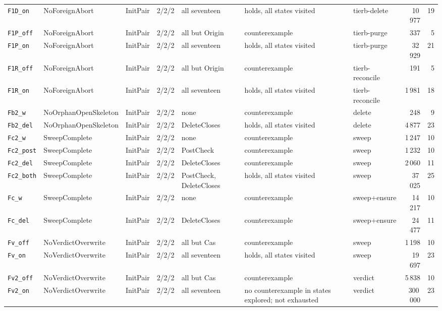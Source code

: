 \documentclass[a4paper,10pt,fleqn]{article}
\begin{document}
{\begin{center}
\begin{tabularx}{\textwidth}{@{}l l l l X X l r r@{}}
\texttt{F1D\_on} & NoForeignAbort & InitPair & 2/2/2 & all seventeen & holds, all states visited & tierb-delete & 10\,977 & 19 \\
\texttt{F1P\_off} & NoForeignAbort & InitPair & 2/2/2 & all but Origin & counterexample & tierb-purge & 337 & 5 \\
\texttt{F1P\_on} & NoForeignAbort & InitPair & 2/2/2 & all seventeen & holds, all states visited & tierb-purge & 32\,929 & 21 \\
\texttt{F1R\_off} & NoForeignAbort & InitPair & 2/2/2 & all but Origin & counterexample & tierb-reconcile & 191 & 5 \\
\texttt{F1R\_on} & NoForeignAbort & InitPair & 2/2/2 & all seventeen & holds, all states visited & tierb-reconcile & 1\,981 & 18 \\
\texttt{Fb2\_w} & NoOrphanOpenSkeleton & InitPair & 2/2/2 & none & counterexample & delete & 248 & 9 \\
\texttt{Fb2\_del} & NoOrphanOpenSkeleton & InitPair & 2/2/2 & DeleteCloses & holds, all states visited & delete & 4\,877 & 23 \\
\texttt{Fc2\_w} & SweepComplete & InitPair & 2/2/2 & none & counterexample & sweep & 1\,247 & 10 \\
\texttt{Fc2\_post} & SweepComplete & InitPair & 2/2/2 & PostCheck & counterexample & sweep & 1\,232 & 10 \\
\texttt{Fc2\_del} & SweepComplete & InitPair & 2/2/2 & DeleteCloses & counterexample & sweep & 2\,060 & 11 \\
\texttt{Fc2\_both} & SweepComplete & InitPair & 2/2/2 & PostCheck, DeleteCloses & holds, all states visited & sweep & 37\,025 & 25 \\
\texttt{Fc\_w} & SweepComplete & InitPair & 2/2/2 & none & counterexample & sweep+ensure & 14\,217 & 10 \\
\texttt{Fc\_del} & SweepComplete & InitPair & 2/2/2 & DeleteCloses & counterexample & sweep+ensure & 24\,477 & 11 \\
\texttt{Fv\_off} & NoVerdictOverwrite & InitPair & 2/2/2 & all but Cas & counterexample & sweep & 1\,198 & 10 \\
\texttt{Fv\_on} & NoVerdictOverwrite & InitPair & 2/2/2 & all seventeen & holds, all states visited & sweep & 19\,697 & 23 \\
\texttt{Fv2\_off} & NoVerdictOverwrite & InitPair & 2/2/2 & all but Cas & counterexample & verdict & 5\,838 & 10 \\
\texttt{Fv2\_on} & NoVerdictOverwrite & InitPair & 2/2/2 & all seventeen & no counterexample in states explored; not exhausted & verdict & 300\,000 & 23 \\

\end{tabularx}
\end{center}}
\end{document}
